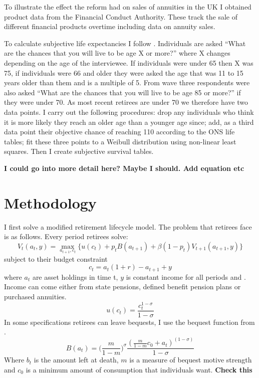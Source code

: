 \documentclass[12pt]{article}
\begin{document}
To illustrate the effect the reform had on sales of annuities in the UK I obtained product data from the Financial Conduct Authority. 
These track the sale of different financial products overtime including data on annuity sales.

To calculate subjective life expectancies I follow \cite{odea_sturrock_rest_2023}. Individuals are asked “What are the chances that you will 
live to be age X or more?” where X changes depending on the age of the interviewee. If individuals were under 65 then X was 75, if individuals
were 66 and older they were asked the age that was 11 to 15 years older than them and is a multiple of 5. From wave three respondents were 
also asked “What are the chances that you will live to be age 85 or more?” if they were under 70. As most recent retirees are under 70 we 
therefore have two data points. I carry out the following procedures: drop any individuals who think it is more likely they reach an older
age than a younger age since; add, as a third data point their objective chance of reaching 110 according to the ONS life tables; fit these
three points to a Weibull distribution using non-linear least squares. Then I create subjective survival tables. 

\textbf{I could go into more detail here? Maybe I should. Add equation etc}



\section{Methodology}

I first solve a modified retirement lifecycle model. The problem that retirees face is as follows. 
Every period retirees solve:
\begin{equation*}
  V_{t}(a_{t}, y) = \underset{a_{t+1}, c_{t}}{\max} \{ u(c_{t}) + p_{t}B(a_{t+1}) + \beta(1-p_{t})V_{t+1}(a_{t+1}, y) \}
\end{equation*}
subject to their budget constraint
\begin{equation*}
  c_{t} =a_{t}(1 +r) -  a_{t+1} + y
\end{equation*}
where $a_{t}$ are asset holdings in time t, $y$ is constant income for all periods and . Income can come either
from state pensions, defined benefit pension plans or purchased annuities.
\begin{equation*}
  u(c_{t}) = \frac{c_{t}^{1 - \sigma}}{1 - \sigma}
\end{equation*} In some specifications retirees can leave bequests, I use the bequest function from
\cite{lockwood_red_2012}.
\begin{equation*}
  B(a_{t}) = \bigl( \frac{m}{1 - m} \bigr)^{\sigma}  \frac{(\frac{m}{1 - m}c_{0} + a_{t})^{(1 - \sigma)}}{1 - \sigma}
\end{equation*}
Where $b_{t}$ is the amount left at death, $m$ is a measure of bequest motive strength and $c_{0}$ is
a minimum amount of consumption that individuals want. \textbf{Check this}
\end{document}
